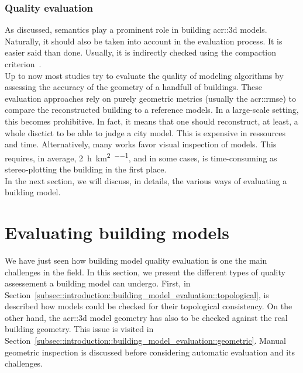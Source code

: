         \subsubsection{Quality evaluation}
            As discussed, semantics play a prominent role in building \gls{acr::3d} models.
            Naturally, it should also be taken into account in the evaluation process.
            It is easier said than done.
            Usually, it is indirectly checked using the compaction criterion~\parencite{lafarge2012creating}.\\
            Up to now most studies try to evaluate the quality of modeling algorithms by assessing the accuracy of the geometry of a handfull of buildings.
            These evaluation approaches rely on purely geometric metrics (usually the \gls{acr::rmse}) to compare the reconstructed building to a reference models.
            In a large-scale setting, this becomes prohibitive.
            In fact, it means that one should reconstruct, at least, a whole disctict to be able to judge a city model.
            This is expensive in ressources and time.
            Alternatively, many works favor visual inspection of models.
            This requires, in average, \SI[per-mode=repeated-symbol]{2}{\hour\per\km\squared\per\expert}, and in some cases, is time-consuming  as stereo-plotting the building in the first place.\\
            In the next section, we will discuss, in details, the various ways of evaluating a building model.

\section{Evaluating building models}
    \label{sec::introduction::building_model_evaluation}
    We have just seen how building model quality evaluation is one the main challenges in the field.
    In this section, we present the different types of quality assessement a building model can undergo.
    First, in Section~\ref{subsec::introduction::building_model_evaluation::topological}, is described how models could be checked for their topological consistency.
    On the other hand, the \gls{acr::3d} model geometry has also to be checked against the real building geometry.
    This issue is visited in Section~\ref{subsec::introduction::building_model_evaluation::geometric}.
    Manual geometric inspection is discussed before considering automatic evaluation and its challenges.

